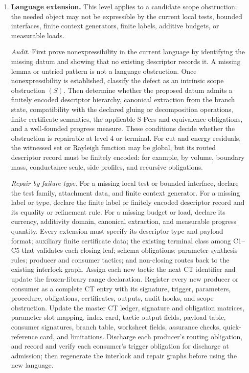 \documentclass[
  11pt,
]{article}
\theoremstyle{definition}
\begin{document}
\begin{enumerate}
  \emph{Exit test.} Every outcome of the new pattern must close at
  C1--C5 or enter an existing consumer through a typed payload, and every
  loop must decrease the declared measure. If the pattern cannot be
  stated using the current descriptor types, the obstruction moves to
  level 4.
\item
  \textbf{Language extension.} This level applies to a candidate scope
  obstruction: the needed object may not be expressible by the current
  local tests, bounded interfaces, finite context generators, finite
  labels, additive budgets, or measurable loads.

  \emph{Audit.} First prove nonexpressibility in the current language by
  identifying the missing datum and showing that no existing descriptor
  records it. A missing lemma or untried pattern is not a language
  obstruction. Once nonexpressibility is established, classify the
  defect as an intrinsic scope obstruction \((S)\). Then determine
  whether the proposed datum admits a finitely encoded descriptor
  hierarchy, canonical extraction from the branch state,
  compatibility with the declared gluing or decomposition operations,
  finite certificate semantics, the applicable S-Pers and equivalence
  obligations, and a well-founded progress measure. These conditions
  decide whether the obstruction is repairable at level 4 or terminal.
  For cut and energy residuals, the witnessed set or Rayleigh function
  may be global, but its routed descriptor record must be finitely
  encoded: for example, by volume, boundary mass, conductance scale, side
  profiles, and recursive obligations.

  \emph{Repair by failure type.} For a missing local test or bounded
  interface, declare the test family, attachment data, and finite context
  generator. For a missing label or type, declare the finite label or
  finitely encoded descriptor record and its equality or refinement
  rule. For a missing budget or load,
  declare its currency, additivity domain, canonical extraction, and
  measurable progress quantity. Every extension must specify its
  descriptor type and payload format; auxiliary finite certificate data;
  the existing terminal class among C1--C5 that validates each closing
  leaf; schema obligations; parameter-synthesis rules; producer and
  consumer tactics; and non-closing routes back to the existing interlock
  graph. Assign each new tactic the next CT identifier and update the
  frozen-library range declaration. Register every new producer or
  consumer as a complete CT entry with its signature, trigger, parameters,
  procedure,
  obligations, certificates, outputs, audit hooks, and scope obstruction.
  Update the master CT ledger, signature and obligation matrices,
  parameter-slot mapping, index card, tactic output fields, payload
  table, consumer signatures, branch table, worksheet fields, assurance
  checks, quick-reference card, and limitations.
  Discharge each producer's routing obligation, and record and verify each consumer's
  trigger obligation for discharge at admission; then regenerate the
  interlock and repair graphs before using the new language.


\end{enumerate}
\end{document}
